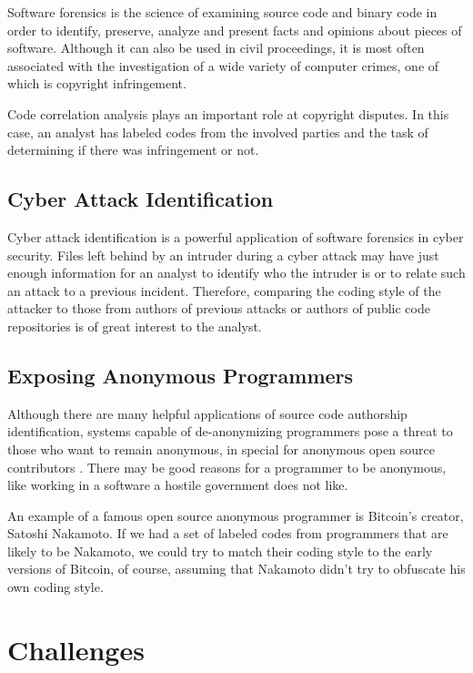 Software forensics is the science of examining source code and binary code in order to identify, preserve, analyze and present facts and opinions about pieces of software. Although it can also be used in civil proceedings, it is most often associated with the investigation of a wide variety of computer crimes, one of which is copyright infringement.

Code correlation analysis plays an important role at copyright disputes. In this case, an analyst has labeled codes from the involved parties and the task of determining if there was infringement or not.

\subsection{Cyber Attack Identification}

Cyber attack identification is a powerful application of software forensics in cyber security. Files left behind by an intruder during a cyber attack may have just enough information for an analyst to identify who the intruder is or to relate such an attack to a previous incident. Therefore, comparing the coding style of the attacker to those from authors of previous attacks or authors of public code repositories is of great interest to the analyst.


\subsection{Exposing Anonymous Programmers}

Although there are many helpful applications of source code authorship identification, systems capable of de-anonymizing programmers pose a threat to those who want to remain anonymous, in special for anonymous open source contributors \cite{gitblame}. There may be good reasons for a programmer to be anonymous, like working in a software a hostile government does not like. 

An example of a famous open source anonymous programmer is Bitcoin's creator, Satoshi Nakamoto. If we had a set of labeled codes from programmers that are likely to be Nakamoto, we could try to match their coding style to the early versions of Bitcoin, of course, assuming that Nakamoto didn't try to obfuscate his own coding style.

\section{Challenges}

